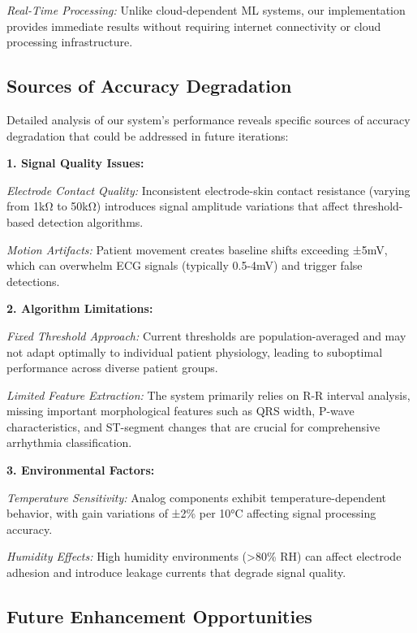 \documentclass[12pt,a4paper]{article}
\begin{document}
\textit{Real-Time Processing:} Unlike cloud-dependent ML systems, our implementation provides immediate results without requiring internet connectivity or cloud processing infrastructure.

\subsection{Sources of Accuracy Degradation}

Detailed analysis of our system's performance reveals specific sources of accuracy degradation that could be addressed in future iterations:

\vspace{0.5cm}

\textbf{1. Signal Quality Issues:}

\textit{Electrode Contact Quality:} Inconsistent electrode-skin contact resistance (varying from 1kΩ to 50kΩ) introduces signal amplitude variations that affect threshold-based detection algorithms.

\textit{Motion Artifacts:} Patient movement creates baseline shifts exceeding ±5mV, which can overwhelm ECG signals (typically 0.5-4mV) and trigger false detections.

\vspace{0.3cm}

\textbf{2. Algorithm Limitations:}

\textit{Fixed Threshold Approach:} Current thresholds are population-averaged and may not adapt optimally to individual patient physiology, leading to suboptimal performance across diverse patient groups.

\textit{Limited Feature Extraction:} The system primarily relies on R-R interval analysis, missing important morphological features such as QRS width, P-wave characteristics, and ST-segment changes that are crucial for comprehensive arrhythmia classification.

\vspace{0.3cm}

\textbf{3. Environmental Factors:}

\textit{Temperature Sensitivity:} Analog components exhibit temperature-dependent behavior, with gain variations of ±2\% per 10°C affecting signal processing accuracy.

\textit{Humidity Effects:} High humidity environments (>80\% RH) can affect electrode adhesion and introduce leakage currents that degrade signal quality.

\subsection{Future Enhancement Opportunities}
\end{document}
